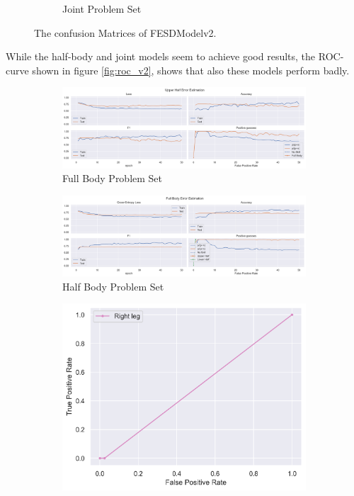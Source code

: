 \begin{figure}
\begin{subfigure}[b]{0.47\linewidth}
      \caption{Joint Problem Set}
      \label{fig:jt_conf}
  \end{subfigure}
  \caption[Confusion Matrices of FESDModelv2]{The confusion Matrices of FESDModelv2.}
  \label{fig:conf_v2}
\end{figure}

While the half-body and joint models seem to achieve good results, the ROC-curve shown in figure \ref{fig:roc_v2}, shows that also these models perform badly.

\begin{figure}
  \centering
  \begin{subfigure}[b]{0.47\linewidth}
      \centering
      \includegraphics[width=\textwidth]{figures/Results/v2/roc/fb.png}
      \caption[]{Full Body Problem Set}
      \label{fig:fb_roc_v2}
  \end{subfigure}
  \hfill
  \begin{subfigure}[b]{0.47\linewidth}
      \centering
      \includegraphics[width=\textwidth]{figures/Results/v2/roc/hb.png}
      \caption[]{Half Body Problem Set}
      \label{fig:hb_roc_v2}
  \end{subfigure}
  \hfill
  \begin{subfigure}[b]{0.47\linewidth}
      \centering
      \includegraphics[width=\textwidth]{figures/Results/v2/roc/bp.png}

\end{subfigure}
\end{figure}
